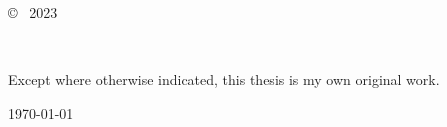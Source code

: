\vspace*{14cm}
\begin{center}
  \makeatletter
  \copyright\ \@author{} 2023
  \makeatother
\end{center}
\noindent
\begin{center}
  \footnotesize{~} %
\end{center}
\noindent

\newpage

\vspace*{7cm}
\begin{center}
  Except where otherwise indicated, this thesis is my own original
  work.
\end{center}

\vspace*{4cm}

\hspace{8cm}\makeatletter\@author\makeatother\par
\hspace{8cm}\today
